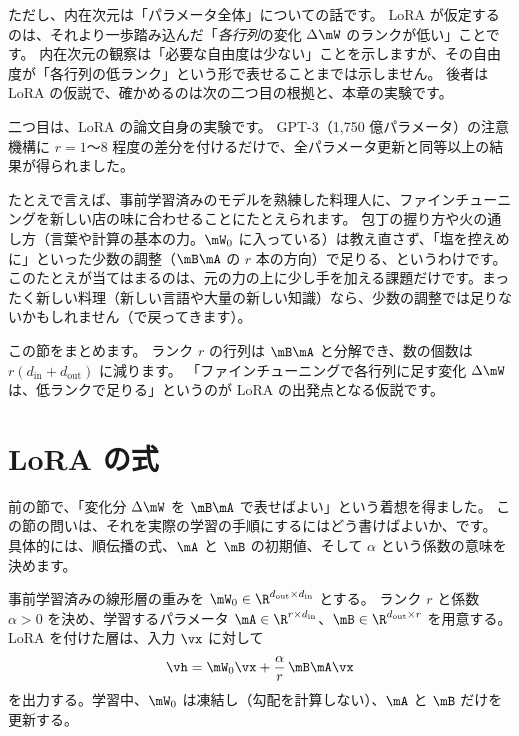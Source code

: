 ただし、内在次元は「パラメータ全体」についての話です。
LoRA が仮定するのは、それより一歩踏み込んだ「\emph{各行列}の変化 $\Delta\mW$ のランクが低い」ことです。
内在次元の観察は「必要な自由度は少ない」ことを示しますが、その自由度が「各行列の低ランク」という形で表せることまでは示しません。
後者は LoRA の仮説で、確かめるのは次の二つ目の根拠と、本章の実験です。

二つ目は、LoRA の論文自身の実験です\cite{hu2022lora}。
GPT-3（1,750 億パラメータ）の注意機構に $r=1$〜$8$ 程度の差分を付けるだけで、全パラメータ更新と同等以上の結果が得られました。

たとえで言えば、事前学習済みのモデルを熟練した料理人に、ファインチューニングを新しい店の味に合わせることにたとえられます。
包丁の握り方や火の通し方（言葉や計算の基本の力。$\mW_0$ に入っている）は教え直さず、「塩を控えめに」といった少数の調整（$\mB\mA$ の $r$ 本の方向）で足りる、というわけです。
このたとえが当てはまるのは、元の力の上に少し手を加える課題だけです。まったく新しい料理（新しい言語や大量の新しい知識）なら、少数の調整では足りないかもしれません（で戻ってきます）。

この節をまとめます。
ランク $r$ の行列は $\mB\mA$ と分解でき、数の個数は $r(d_{\text{in}}+d_{\text{out}})$ に減ります。
「ファインチューニングで各行列に足す変化 $\Delta\mW$ は、低ランクで足りる」というのが LoRA の出発点となる仮説です。

\section{LoRA の式}\label{sec:lora-def}

前の節で、「変化分 $\Delta\mW$ を $\mB\mA$ で表せばよい」という着想を得ました。
この節の問いは、それを実際の学習の手順にするにはどう書けばよいか、です。
具体的には、順伝播の式、$\mA$ と $\mB$ の初期値、そして $\alpha$ という係数の意味を決めます。

\begin{definition}[LoRA]
事前学習済みの線形層の重みを $\mW_0\in\R^{d_{\text{out}}\times d_{\text{in}}}$ とする。
ランク $r$ と係数 $\alpha>0$ を決め、学習するパラメータ $\mA\in\R^{r\times d_{\text{in}}}$、$\mB\in\R^{d_{\text{out}}\times r}$ を用意する。
LoRA を付けた層は、入力 $\vx$ に対して
\begin{equation}
\vh=\mW_0\vx+\frac{\alpha}{r}\,\mB\mA\vx
\label{eq:lora-forward}
\end{equation}
を出力する。学習中、$\mW_0$ は凍結し（勾配を計算しない）、$\mA$ と $\mB$ だけを更新する。
\end{definition}

